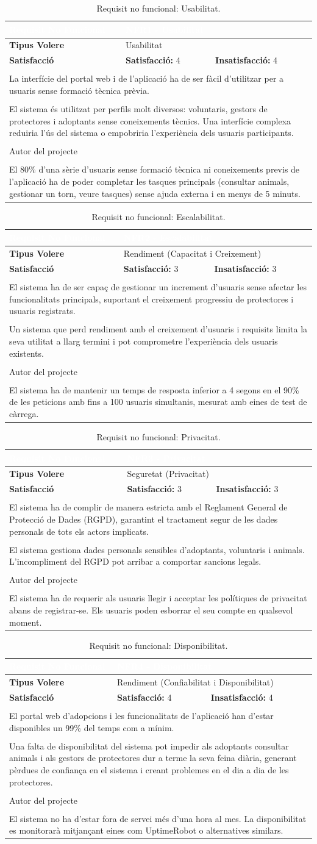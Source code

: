 \documentclass[11pt,a4paper]{report}
\newcommand{\RNF}[9]{%
\begin{table}[H]\centering\footnotesize\renewcommand{\arraystretch}{1.1}%
\setlength{\extrarowheight}{0pt}%
\begin{tabular}{|l|p{4.8cm}|p{4.8cm}|}\hline
\rowcolor{oceanblue}\textcolor{white}{\textbf{Requisit No Funcional}} & \multicolumn{2}{l|}{\textcolor{white}{\textbf{#1 - #3}}} \\\hline
\textbf{Tipus Volere} & \multicolumn{2}{l|}{#2} \\\hline
\rowcolor{gray!10}\textbf{Satisfacció} & \textbf{Satisfacció: } #8 & \textbf{Insatisfacció: } #9 \\\hline
\rowcolor{oceanblue}\multicolumn{3}{|l|}{\textcolor{white}{\textbf{Descripció}}} \\\hline
\multicolumn{3}{|p{12.5cm}|}{#4} \\\hline
\rowcolor{oceanblue}\multicolumn{3}{|l|}{\textcolor{white}{\textbf{Justificació}}} \\\hline
\multicolumn{3}{|p{12.5cm}|}{#5} \\\hline
\rowcolor{oceanblue}\multicolumn{3}{|l|}{\textcolor{white}{\textbf{Origen}}} \\\hline
\multicolumn{3}{|p{12.5cm}|}{#6} \\\hline
\rowcolor{oceanblue}\multicolumn{3}{|l|}{\textcolor{white}{\textbf{Criteri d'Acceptació}}} \\\hline
\multicolumn{3}{|p{12.5cm}|}{#7} \\\hline
\end{tabular}\caption[RNF: #3]{Requisit no funcional: #3.}\label{tab:rnf_#1}\end{table}%
}
\begin{document}
\RNF
  {NFR1}
  {Usabilitat}
  {Usabilitat}
  {La interfície del portal web i de l'aplicació ha de ser fàcil d'utilitzar per a usuaris sense formació tècnica prèvia.}
  {El sistema és utilitzat per perfils molt diversos: voluntaris, gestors de protectores i adoptants sense coneixements tècnics. Una interfície complexa reduiria l'ús del sistema o empobriria l'experiència dels usuaris participants.}
  {Autor del projecte}
  {El 80\% d'una sèrie d'usuaris sense formació tècnica ni coneixements previs de l'aplicació ha de poder completar les tasques principals (consultar animals, gestionar un torn, veure tasques) sense ajuda externa i en menys de 5 minuts.}
  {4}
  {4}

\RNF
  {NFR2}
  {Rendiment (Capacitat i Creixement)}
  {Escalabilitat}
  {El sistema ha de ser capaç de gestionar un increment d'usuaris sense afectar les funcionalitats principals, suportant el creixement progressiu de protectores i usuaris registrats.}
  {Un sistema que perd rendiment amb el creixement d'usuaris i requisits limita la seva utilitat a llarg termini i pot comprometre l'experiència dels usuaris existents.}
  {Autor del projecte}
  {El sistema ha de mantenir un temps de resposta inferior a 4 segons en el 90\% de les peticions amb fins a 100 usuaris simultanis, mesurat amb eines de test de càrrega.}
  {3}
  {3}

\RNF
  {NFR3}
  {Seguretat (Privacitat)}
  {Privacitat}
  {El sistema ha de complir de manera estricta amb el Reglament General de Protecció de Dades (RGPD), garantint el tractament segur de les dades personals de tots els actors implicats.}
  {El sistema gestiona dades personals sensibles d'adoptants, voluntaris i animals. L'incompliment del RGPD pot arribar a comportar sancions legals.}
  {Autor del projecte}
  {El sistema ha de requerir als usuaris llegir i acceptar les polítiques de privacitat abans de registrar-se. Els usuaris poden esborrar el seu compte en qualsevol moment.} 
  {3}
  {3}

\RNF
  {NFR4}
  {Rendiment (Confiabilitat i Disponibilitat)}
  {Disponibilitat}
  {El portal web d'adopcions i les funcionalitats de l'aplicació han d'estar disponibles un 99\% del temps com a mínim.}
  {Una falta de disponibilitat del sistema pot impedir als adoptants consultar animals i als gestors de protectores dur a terme la seva feina diària, generant pèrdues de confiança en el sistema i creant problemes en el dia a dia de les protectores.}
  {Autor del projecte}
  {El sistema no ha d'estar fora de servei més d'una hora al mes. La disponibilitat es monitorarà   mitjançant eines com UptimeRobot o alternatives similars.}
  {4}
  {4}
\end{document}
